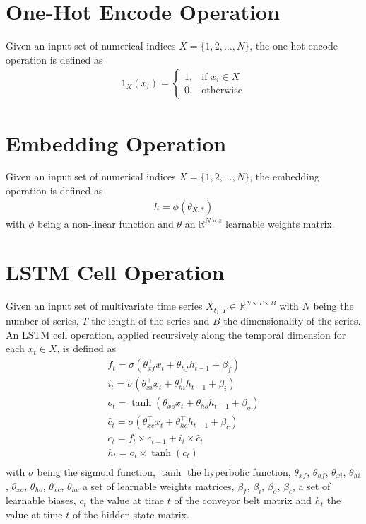 \section{One-Hot Encode Operation}
Given an input set of numerical indices $X = \{1, 2, \dots, N\}$, the one-hot encode operation is defined as 
\begin{gather}
    \label{one_hot_encode_operation}
    1_X(x_i) = 
    \begin{cases}
        1,& \text{if } x_i \in X \\
        0,              & \text{otherwise}
    \end{cases}
\end{gather}

\section{Embedding Operation}
Given an input set of numerical indices $X = \{1, 2, \dots, N\}$, the embedding operation is defined as 
\begin{gather}
    \label{embedding_operation}
    h = \phi(\theta_{X,*})
\end{gather}
with $\phi$ being a non-linear function and $\theta$ an $\mathbb{R}^{N \times z}$ learnable weights matrix.

\section{LSTM Cell Operation}
Given an input set of multivariate time series $X_{t_1:T} \in \mathbb{R}^{N \times T \times B}$ with $N$ being the number of series, $T$ the length of the series and $B$ the dimensionality of the series. An LSTM cell operation, applied recursively along the temporal dimension for each $x_t \in X$, is defined as
\begin{gather}
    \label{lstm_operation}
    f_t = \sigma(\theta_{xf}^\top x_t + \theta_{hf}^\top h_{t-1} + \beta_f) \\ \nonumber
    i_t = \sigma(\theta_{xi}^\top x_t + \theta_{hi}^\top h_{t-1} + \beta_i) \\ \nonumber
    o_t = \tanh(\theta_{xo}^\top x_t + \theta_{ho}^\top h_{t-1} + \beta_o) \\ \nonumber
    \widehat{c}_t = \sigma(\theta_{xc}^\top x_t + \theta_{hc}^\top h_{t-1} + \beta_c) \\ \nonumber
    c_t = f_t \times c_{t-1} + i_t \times \widehat{c}_t \\ \nonumber
    h_t = o_t \times \tanh(c_t) \\ \nonumber
\end{gather}
with $\sigma$  being the sigmoid function, $\tanh$ the hyperbolic function, $\theta_{xf}$, $\theta_{hf}$, $\theta_{xi}$, $\theta_{hi}$, $\theta_{xo}$, $\theta_{ho}$, $\theta_{xc}$, $\theta_{hc}$ a set of learnable weights matrices, $\beta_f$, $\beta_i$, $\beta_o$, $\beta_c$, a set of learnable biases, $c_t$ the value at time $t$ of the conveyor belt matrix and $h_t$ the value at time $t$ of the hidden state matrix.

